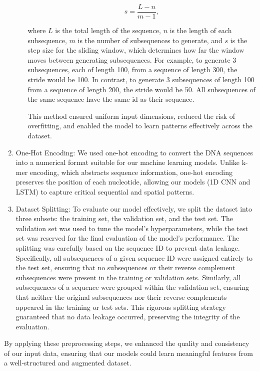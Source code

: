 \begin{enumerate}
\begin{itemize}
$$  s = \frac{L-n} {m-1},$$

 
where $L$ is the total length of the sequence, $n$ is the length of each subsequence, 
$m$ is the number of subsequences to generate, and $s$ is the step size for the sliding window, which determines how far the window moves between generating subsequences. For example, to generate 3 subsequences, each of length 100, from a sequence of length 300, the stride would be 100. In contrast, to generate 3 subsequences of length 100 from a sequence of length 200, the stride would be 50.
All subsequences of the same sequence have the same id as their sequence.

This method ensured uniform input dimensions, reduced the risk of overfitting, and enabled the model to learn patterns effectively across the dataset.
\end{itemize}

\item{One-Hot Encoding:}
We used one-hot encoding to convert the DNA sequences into a numerical format suitable for our machine learning models. Unlike k-mer encoding, which abstracts sequence information, one-hot encoding preserves the position of each nucleotide, allowing our models (1D CNN and LSTM) to capture critical sequential and spatial patterns.

\item{Dataset Splitting:}
To evaluate our model effectively, we split the dataset into three subsets: the training set, the validation set, and the test set. The validation set was used to tune the model's hyperparameters, while the test set was reserved for the final evaluation of the model's performance. The splitting was carefully based on the sequence ID to prevent data leakage. Specifically, all subsequences of a given sequence ID were assigned entirely to the test set, ensuring that no subsequences or their reverse complement subsequences were present in the training or validation sets. Similarly, all subsequences of a sequence were grouped within the validation set, ensuring that neither the original subsequences nor their reverse complements appeared in the training or test sets. This rigorous splitting strategy guaranteed that no data leakage occurred, preserving the integrity of the evaluation.



\end{enumerate}

By applying these preprocessing steps, we enhanced the quality and consistency of our input data, ensuring that our models could learn meaningful features from a well-structured and augmented dataset.

